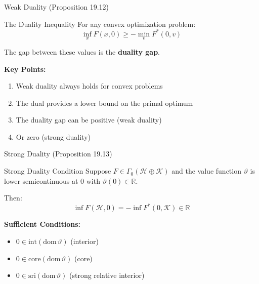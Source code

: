 \documentclass[aspectratio=169,10pt]{beamer}
\begin{document}
\begin{frame}{Weak Duality (Proposition 19.12)}
    \begin{block}{The Duality Inequality}
        For any convex optimization problem:
        $$\inf_x F(x, 0) \geq -\min_v F^*(0, v)$$

        The gap between these values is the \textbf{duality gap}.
    \end{block}

    \vspace{10pt}

    \textbf{Key Points:}
    \begin{enumerate}
        \item Weak duality always holds for convex problems
        \item The dual provides a lower bound on the primal optimum
        \item The duality gap can be positive (weak duality)
        \item Or zero (strong duality)
    \end{enumerate}
\end{frame}

\begin{frame}{Strong Duality (Proposition 19.13)}
    \begin{block}{Strong Duality Condition}
        Suppose $F \in \Gamma_0(\mathcal{H} \oplus \mathcal{K})$ and the value function $\vartheta$ is lower semicontinuous at 0 with $\vartheta(0) \in \mathbb{R}$.

        Then:
        $$\inf F(\mathcal{H}, 0) = -\inf F^*(0, \mathcal{K}) \in \mathbb{R}$$
    \end{block}

    \vspace{10pt}

    \textbf{Sufficient Conditions:}
    \begin{itemize}
        \item $0 \in \text{int}(\text{dom}\, \vartheta)$ (interior)
        \item $0 \in \text{core}(\text{dom}\, \vartheta)$ (core)
        \item $0 \in \text{sri}(\text{dom}\, \vartheta)$ (strong relative interior)
    \end{itemize}
\end{frame}
\end{document}
